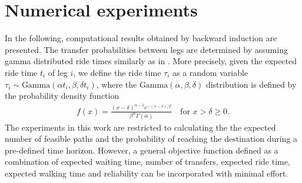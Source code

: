 \documentclass[dissertation,draft*]{aaltoseries}
\begin{document}
% 
 





\section{Numerical experiments}
\label{experiments}
In the following, computational results obtained by backward induction are presented. 
The transfer probabilities between legs are determined by assuming 
gamma distributed ride times similarly as in 
\cite{russell, chiang}. 
More precisely, given the expected ride time $t_i$ of leg $i$, we define the 
ride time $\tau_{i}$ as a random variable $\tau_{i} \sim \text{Gamma}( \alpha t_{i}, \beta , \delta t_{i} )$,
where the $\text{Gamma}( \alpha, \beta , \delta )$ distribution is defined by the 
probability density function 
\begin{align}
\label{gammakaava}
f(x)=\frac{(x-\delta)^{\alpha-1} e^{-(x-\delta)/\beta}}{\beta^{\alpha} \Gamma (\alpha)} \ \ \ \mbox{ for } x > \delta \geq 0.
\end{align}
The experiments in this work are restricted to calculating the the expected number of feasible paths and 
the probability of reaching the destination during a pre-defined time horizon. However, a general objective function
defined as a combination of expected waiting time, number of transfers, expected ride time, expected walking time and reliability
can be incorporated with minimal effort.
\end{document}
